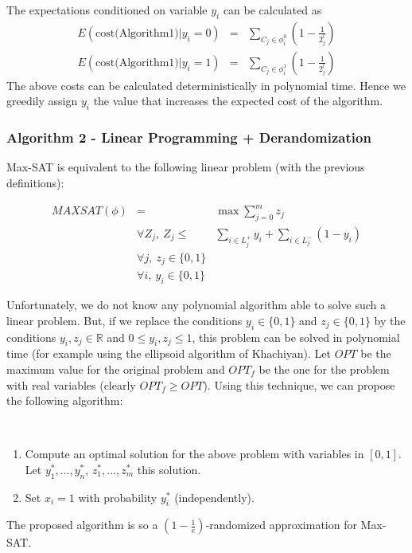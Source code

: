 The expectations conditioned on variable $y_i$ can be calculated as  
\begin{eqnarray}
E(\mbox{cost(Algorithm1)} | y_i = 0) & = &\sum_{C_j \in \phi_i^0} ( 1 - \frac{1}{2^l_j}) \nonumber \\
E(\mbox{cost(Algorithm1)} | y_i = 1) & = &\sum_{C_j \in \phi_i^1} ( 1 - \frac{1}{2^l_j}) \nonumber
\end{eqnarray}
The above costs can be calculated deterministically in polynomial time. Hence we greedily assign $y_i$ the value that increases the expected cost of
the algorithm.


\subsubsection{Algorithm 2 - Linear Programming + Derandomization}

Max-SAT is equivalent to the following linear problem (with the previous definitions):

\begin{eqnarray}
MAXSAT(\phi) & = &\max \sum_{j=0}^m z_j \nonumber \\
&\forall Z_j,~Z_j \leq &\sum_{i \in L_j^+} y_i + \sum_{i \in L_j^-} (1 - y_i) \nonumber \\
&\forall j,~ z_j \in \{0, 1\} \nonumber \\
&\forall i,~  y_i \in \{0, 1\} \nonumber 
\end{eqnarray}

Unfortunately, we do not know any polynomial algorithm able to solve such a linear
problem. But, if we replace the conditions $y_i \in \{0,1\}$ and $z_j \in \{0,1\}$
by the conditions $y_i, z_j \in \mathbb{R}$ and $0 \le y_i, z_j \le 1$, this problem
can be solved in polynomial time (for example using the ellipsoid algorithm of
Khachiyan). Let $OPT$ be the maximum value for the original problem and $OPT_f$ be
the one for the problem with real variables (clearly $OPT_f \ge OPT$). Using this
technique, we can propose the following algorithm:


\begin{theorem}
~
\begin{enumerate}
\item Compute an optimal solution for the above problem with variables in $[0,1]$.
Let $y^*_1, \dots, y^*_n$, $z^*_1, \dots, z^*_m$ this solution.
\item Set $x_i = 1$ with probability $y^*_i$ (independently).\\
\end{enumerate}
The proposed algorithm is so a $(1 - \frac{1}{e})$-randomized approximation for
Max-SAT.
\end{theorem}


